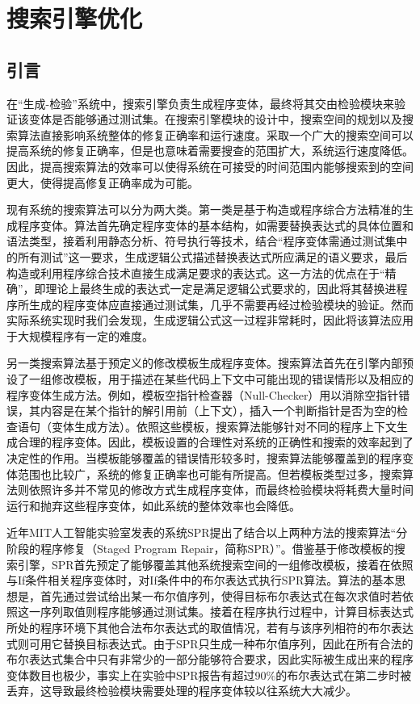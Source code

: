 \chapter{搜索引擎优化}
\label{cha:filter}
\newcommand{\SmartDebug}{
	\textbf{\textit{SmartDebug}}
}

\section{引言}%
在“生成-检验”系统中，搜索引擎负责生成程序变体，最终将其交由检验模块来验证该变体是否能够通过测试集。在搜索引擎模块的设计中，搜索空间的规划以及搜索算法直接影响系统整体的修复正确率和运行速度。采取一个广大的搜索空间可以提高系统的修复正确率，但是也意味着需要搜查的范围扩大，系统运行速度降低。因此，提高搜索算法的效率可以使得系统在可接受的时间范围内能够搜索到的空间更大，使得提高修复正确率成为可能。

现有系统的搜索算法可以分为两大类。第一类是基于构造或程序综合方法精准的生成程序变体。算法首先确定程序变体的基本结构，如需要替换表达式的具体位置和语法类型，接着利用静态分析、符号执行等技术，结合“程序变体需通过测试集中的所有测试”这一要求，生成逻辑公式描述替换表达式所应满足的语义要求，最后构造或利用程序综合技术直接生成满足要求的表达式。这一方法的优点在于“精确”，即理论上最终生成的表达式一定是满足逻辑公式要求的，因此将其替换进程序所生成的程序变体应直接通过测试集，几乎不需要再经过检验模块的验证。然而实际系统实现时我们会发现，生成逻辑公式这一过程非常耗时，因此将该算法应用于大规模程序有一定的难度。

另一类搜索算法基于预定义的修改模板生成程序变体。搜索算法首先在引擎内部预设了一组修改模板，用于描述在某些代码上下文中可能出现的错误情形以及相应的程序变体生成方法。例如，模板空指针检查器（Null-Checker）用以消除空指针错误，其内容是在某个指针的解引用前（上下文），插入一个判断指针是否为空的检查语句（变体生成方法）。依照这些模板，搜索算法能够针对不同的程序上下文生成合理的程序变体。因此，模板设置的合理性对系统的正确性和搜索的效率起到了决定性的作用。当模板能够覆盖的错误情形较多时，搜索算法能够覆盖到的程序变体范围也比较广，系统的修复正确率也可能有所提高。但若模板类型过多，搜索算法则依照许多并不常见的修改方式生成程序变体，而最终检验模块将耗费大量时间运行和抛弃这些程序变体，如此系统的整体效率也会降低。

近年MIT人工智能实验室发表的系统SPR提出了结合以上两种方法的搜索算法“分阶段的程序修复（Staged Program Repair，简称SPR）”。借鉴基于修改模板的搜索引擎，SPR首先预定了能够覆盖其他系统搜索空间的一组修改模板，接着在依照与If条件相关程序变体时，对If条件中的布尔表达式执行SPR算法。算法的基本思想是，首先通过尝试给出某一布尔值序列，使得目标布尔表达式在每次求值时若依照这一序列取值则程序能够通过测试集。接着在程序执行过程中，计算目标表达式所处的程序环境下其他合法布尔表达式的取值情况，若有与该序列相符的布尔表达式则可用它替换目标表达式。由于SPR只生成一种布尔值序列，因此在所有合法的布尔表达式集合中只有非常少的一部分能够符合要求，因此实际被生成出来的程序变体数目也极少，事实上在实验中SPR报告有超过90\%的布尔表达式在第二步时被丢弃，这导致最终检验模块需要处理的程序变体较以往系统大大减少。


